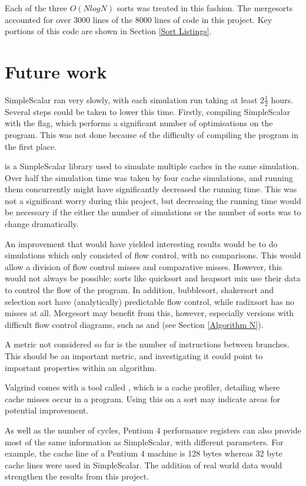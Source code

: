 Each of the three $O(NlogN)$ sorts was treated in this fashion. The mergesorts
accounted for over 3000 lines of the 8000 lines of code in this project. Key
portions of this code are shown in Section \ref{Sort Listings}.

\section{Future work}
SimpleScalar ran very slowly, with each simulation run taking at least $2
\frac{1}{2}$ hours. Several steps could be taken to lower this time. Firstly,
compiling SimpleScalar with the  flag, which performs a significant
number of optimisations on the program. This was not done because of the
difficulty of compiling the program in the first place.

 is a SimpleScalar library used to simulate multiple
caches in the same simulation. Over half the simulation time was taken by four
cache simulations, and running them concurrently might have significantly
decreased the running time. This was not a significant worry during this project,
but decreasing the running time would be necessary if the either the number of
simulations or the number of sorts was to change dramatically.

An improvement that would have yielded interesting results would be to do simulations
which only consisted of flow control, with no comparisons. This would allow a
division of flow control misses and comparative misses. However, this would not
always be possible; sorts like quicksort and heapsort mix use their data to
control the flow of the program. In addition, bubblesort, shakersort and
selection sort have (analytically) predictable flow control, while radixsort has
no misses at all. Mergesort may benefit from this, however, especially versions
with difficult flow control diagrams, such as  and  (see Section \ref{Algorithm N}).

A metric not considered so far is the number of instructions between branches.
This should be an important metric, and investigating it could point to
important properties within an algorithm.

Valgrind comes with a tool called , which is a cache
profiler, detailing where cache misses occur in a program. Using this on a
sort may indicate areas for potential improvement.

As well as the number of cycles, Pentium 4 performance registers can also provide
most of the same information as SimpleScalar, with different parameters. For
example, the cache line of a Pentium 4 machine is 128 bytes whereas 32 byte
cache lines were used in SimpleScalar.  The addition of real world data would
strengthen the results from this project.
